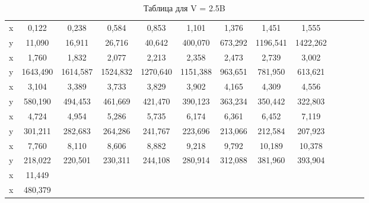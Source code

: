 \documentclass[14pt,a4paper]{scrartcl}
\begin{document}
		\begin{table}[h!]
		\caption{Таблица для V = 2.5B}
		\begin{center}
			\begin{tabular}{|c|c|c|c|c|c|c|c|c|c|c|c|c|}
				\hline 
			 x & 0,122 & 0,238 & 0,584 & 0,853 & 1,101 & 1,376 & 1,451 & 1,555   \\
			 y & 11,090 & 16,911 & 26,716 & 40,642 & 400,070 & 673,292 & 1196,541 & 1422,262   \\ \hline
			 
			 x & 1,760 & 1,832 & 2,077 & 2,213 & 2,358 & 2,473 & 2,739 & 3,002   \\
			 y & 1643,490 & 1614,587 & 1524,832 & 1270,640 & 1151,388 & 963,651 & 781,950 & 613,621    \\ \hline
			 
			 x & 3,104 & 3,389 & 3,733 & 3,829 & 3,902 & 4,165 & 4,309 & 4,556   \\
			 y & 580,190 & 494,453 & 461,669 & 421,470 & 390,123 & 363,234 & 350,442 & 322,803     \\ \hline
			 
			 x & 4,724 & 4,954 & 5,286 & 5,735 & 6,174 & 6,361 & 6,452 & 7,119    \\
			 y & 301,211 & 282,683 & 264,286 & 241,767 & 223,696 & 213,066 & 212,584 & 207,923    \\ \hline
			 
			 x & 7,760 & 8,110 & 8,606 & 8,882 & 9,218 & 9,792 & 10,189 & 10,378    \\
			 y & 218,022 & 220,501 & 230,311 & 244,108 & 280,914 & 312,088 & 381,960 & 393,904    \\ \hline
			 
			 x & 11,449 &  &  &  &  &  &  &  &      \\
			 x & 480,379 &  &  &  &  &  &  &  &      \\

			 
				\hline 
			\end{tabular} 
		\end{center}
		\label{table_mn}
	\end{table}
\end{document}
